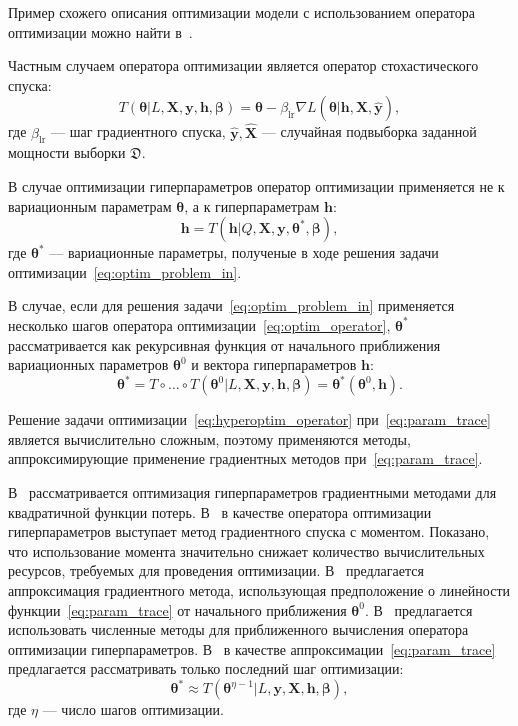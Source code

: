 Пример схожего описания оптимизации модели с использованием оператора оптимизации можно найти в~\cite{early}.

Частным случаем оператора оптимизации является оператор стохастического спуска:
\begin{equation}
\label{eq:sgd_operator}
    T( \boldsymbol{\theta}| L,\mathbf{X},  \mathbf{y},  \mathbf{h}, \boldsymbol{\beta}) = \boldsymbol{\theta} - \beta_{\text{lr}} \nabla L(\boldsymbol{\theta}|   \mathbf{h},  \hat{\mathbf{X}}, \hat{\mathbf{y}}),
\end{equation}
где $\beta_{\text{lr}}$ --- шаг градиентного спуска, $\hat{\mathbf{y}}, \hat{\mathbf{X}}$ --- случайная подвыборка заданной мощности выборки $\mathfrak{D}$.

В случае оптимизации гиперпараметров оператор оптимизации применяется не к вариационным параметрам $\boldsymbol{\theta}$, а к гиперпараметрам $\mathbf{h}$:
\begin{equation}
\label{eq:hyperoptim_operator}
    \mathbf{h} = T(\mathbf{h} | Q,  \mathbf{X},  \mathbf{y},\boldsymbol{\theta}^{*}, \boldsymbol{\beta}),
\end{equation}
где $\boldsymbol{\theta}^{*}$ --- вариационные параметры, полученые в ходе решения задачи оптимизации~\eqref{eq:optim_problem_in}.

В случае, если для решения задачи~\eqref{eq:optim_problem_in} применяется несколько шагов оператора оптимизации~\eqref{eq:optim_operator},
$\boldsymbol{\theta}^{*}$ рассматривается как рекурсивная функция от начального приближения вариационных параметров $\boldsymbol{\theta}^{0}$ и вектора гиперпараметров $\mathbf{h}$:
\begin{equation}
\label{eq:param_trace}
    \boldsymbol{\theta}^{*} = T \circ \dots \circ T(\boldsymbol{\theta}^0 | L, \mathbf{X}, \mathbf{y},  \mathbf{h}, \boldsymbol{\beta}) = \boldsymbol{\theta}^{*}(\boldsymbol{\theta}^{0}, \mathbf{h}).
\end{equation}

Решение задачи оптимизации~\eqref{eq:hyperoptim_operator} при~\eqref{eq:param_trace} является вычислительно сложным, поэтому применяются методы, аппроксимирующие применение градиентных методов при~\eqref{eq:param_trace}.

В~\cite{hyper_bengio} рассматривается оптимизация гиперпараметров градиентными методами для квадратичной функции потерь. В~\cite{hyper} в качестве оператора оптимизации гиперпараметров выступает метод градиентного спуска с моментом. Показано, что использование момента значительно снижает количество вычислительных ресурсов, требуемых для проведения оптимизации. В~\cite{hyper_mad} предлагается аппроксимация градиентного метода, использующая предположение о линейности функции~\eqref{eq:param_trace} от начального приближения $\boldsymbol{\theta}^0$. В~\cite{hyper_hoag} предлагается использовать численные методы для приближенного вычисления оператора оптимизации гиперпараметров. В~\cite{greed_hyper} в качестве аппроксимации~\eqref{eq:param_trace} предлагается рассматривать только последний шаг оптимизации:
\[
    \boldsymbol{\theta}^{*} \approx T(\boldsymbol{\theta}^{\eta-1} | L, \mathbf{y}, \mathbf{X}, \mathbf{h}, \boldsymbol{\beta}),
\]
где $\eta$ --- число шагов оптимизации.


